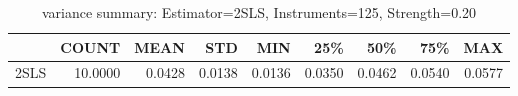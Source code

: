 \begin{table}[ht]
\centering
\caption{variance summary: Estimator=2SLS, Instruments=125, Strength=0.20}
\begin{tabular}{lrrrrrrrr}
\toprule
 & COUNT & MEAN & STD & MIN & 25\% & 50\% & 75\% & MAX \\
\midrule
2SLS & 10.0000 & 0.0428 & 0.0138 & 0.0136 & 0.0350 & 0.0462 & 0.0540 & 0.0577 \\
\bottomrule
\end{tabular}
\end{table}

